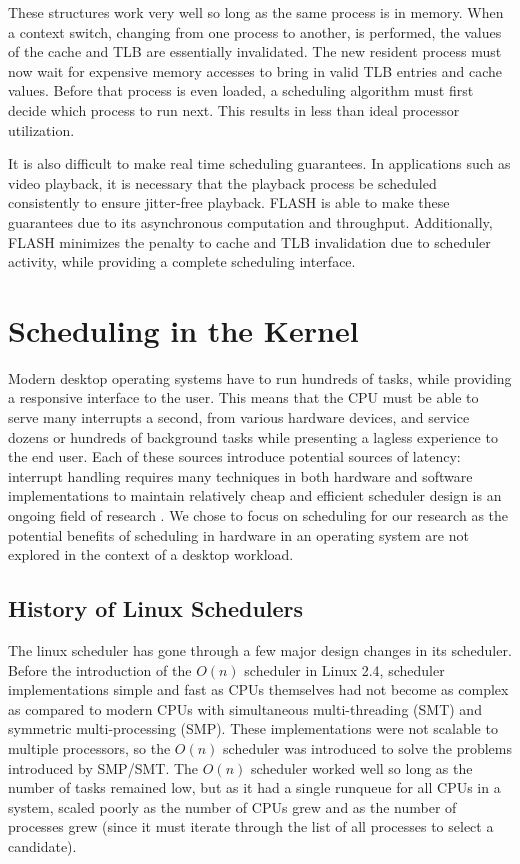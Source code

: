 \documentclass{sig-alternate-10pt}
\begin{document}
These structures work very well so long as the same process is in memory. When a context switch, changing from one process to another, is performed, the values of the cache and TLB are essentially invalidated. The new resident process must now wait for expensive memory accesses to bring in valid TLB entries and cache values. Before that process is even loaded, a scheduling algorithm must first decide which process to run next. This results in less than ideal processor utilization.

It is also difficult to make real time scheduling guarantees. In applications such as video playback, it is necessary that the playback process be scheduled consistently to ensure jitter-free playback. FLASH is able to make these guarantees due to its asynchronous computation and throughput. Additionally, FLASH minimizes the penalty to cache and TLB invalidation due to scheduler activity, while providing a complete scheduling interface.

\section{Scheduling in the Kernel}
Modern desktop operating systems have to run hundreds of tasks, while providing a responsive interface to the user. This means that the CPU must be able to serve many interrupts a second, from various hardware devices, and service dozens or hundreds of background tasks while presenting a lagless experience to the end user. Each of these sources introduce potential sources of latency: interrupt handling \cite{regehr2007safe} requires many techniques in both hardware and software implementations to maintain relatively cheap and efficient scheduler design is an ongoing field of research \cite{wong2008cfs} \cite{park2008hardware} \cite{morton2004hardware}. We chose to focus on scheduling for our research as the potential benefits of scheduling in hardware in an operating system are not explored in the context of a desktop workload.

\subsection{History of Linux Schedulers}
The linux scheduler has gone through a few major design changes in its scheduler. Before the introduction of the $ O(n) $ scheduler in Linux 2.4, scheduler implementations simple and fast as CPUs themselves had not become as complex as compared to modern CPUs with simultaneous multi-threading (SMT) and symmetric multi-processing (SMP). These implementations were not scalable to multiple processors, so the $ O(n) $ scheduler was introduced to solve the problems introduced by SMP/SMT. The $ O(n) $ scheduler worked well so long as the number of tasks remained low, but as it had a single runqueue for all CPUs in a system, scaled poorly as the number of CPUs grew and as the number of processes grew (since it must iterate through the list of all processes to select a candidate).
\end{document}
